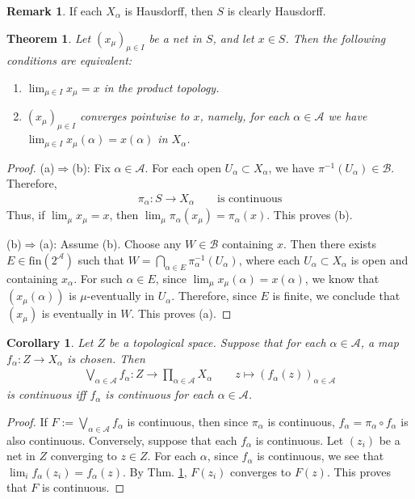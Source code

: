 \documentclass[12pt,b5paper,notitlepage]{article}
\theoremstyle{definition}
\newtheorem{rem}[df]{Remark}
\theoremstyle{plain}
\newtheorem{thm}[df]{Theorem}
\newtheorem{co}[df]{Corollary}
\newcommand{\mc}{\mathcal}
\newcommand{\scr}{\mathscr}
\newcommand{\fin}{\mathrm{fin}}
\newcommand{\dps}{\displaystyle}
\newcommand{\MB}{\mathcal B}
\numberwithin{equation}{section}
\begin{document}
\begin{rem}
If each $X_\alpha$ is Hausdorff, then $S$ is clearly Hausdorff.
\end{rem}


\begin{thm}\label{lb50}
Let $(x_\mu)_{\mu\in I}$ be a net in $S$, and let $x\in S$. Then the following conditions are equivalent:
\begin{enumerate}[label=(\alph*)]
\item $\dps\lim_{\mu\in I}x_\mu=x$ in the product topology.
\item $(x_\mu)_{\mu\in I}$ converges pointwise to $x$, namely, for each $\alpha\in\scr A$ we have $\dps\lim_{\mu\in I}x_\mu(\alpha)=x(\alpha)$ in $X_\alpha$.
\end{enumerate}
\end{thm}


\begin{proof}
(a)$\Rightarrow$(b): Fix $\alpha\in\scr A$. For each open $U_\alpha\subset X_\alpha$, we have $\pi^{-1}(U_\alpha)\in\mc B$. Therefore,
\begin{align}
\pi_\alpha:S\rightarrow X_\alpha\qquad\text{is continuous}
\end{align}
Thus, if $\lim_\mu x_\mu=x$, then $\lim_\mu \pi_\alpha(x_\mu)=\pi_\alpha(x)$. This proves (b).

(b)$\Rightarrow$(a): Assume (b). Choose any $W\in\MB$ containing $x$. Then there exists $E\in\fin(2^{\scr A})$ such that $W=\bigcap_{\alpha\in E}\pi_\alpha^{-1}(U_\alpha)$, where each $U_\alpha\subset X_\alpha$ is open and containing $x_\alpha$. For such $\alpha\in E$, since $\lim_\mu x_\mu(\alpha)=x(\alpha)$, we know that $(x_\mu(\alpha))$ is $\mu$-eventually in $U_\alpha$. Therefore, since $E$ is finite, we conclude that $(x_\mu)$ is eventually in $W$. This proves (a).
\end{proof}

\begin{co}\label{lb55}
Let $Z$ be a topological space. Suppose that for each $\alpha\in\scr A$, a map $f_\alpha:Z\rightarrow X_\alpha$  is chosen. Then \index{zz@$\bigvee_{\alpha\in\scr A}f_\alpha$}
\begin{gather}
\bigvee_{\alpha\in\scr A}f_\alpha:Z\rightarrow\prod_{\alpha\in\scr A}X_\alpha\qquad z\mapsto (f_\alpha(z))_{\alpha\in\scr A}
\end{gather}
is continuous iff $f_\alpha$ is continuous for each $\alpha\in\scr A$.
\end{co}

\begin{proof}
If $F:=\bigvee_{\alpha\in\scr A}f_\alpha$ is continuous, then since $\pi_\alpha$ is continuous, $f_\alpha=\pi_\alpha\circ f_\alpha$ is also continuous. Conversely, suppose that each $f_\alpha$ is continuous. Let $(z_i)$ be a net in $Z$ converging to $z\in Z$. For each $\alpha$, since $f_\alpha$ is continuous, we see that $\lim_if_\alpha(z_i)=f_\alpha(z)$. By Thm. \ref{lb50}, $F(z_i)$ converges to $F(z)$. This proves that $F$ is continuous.
\end{proof}
\end{document}
